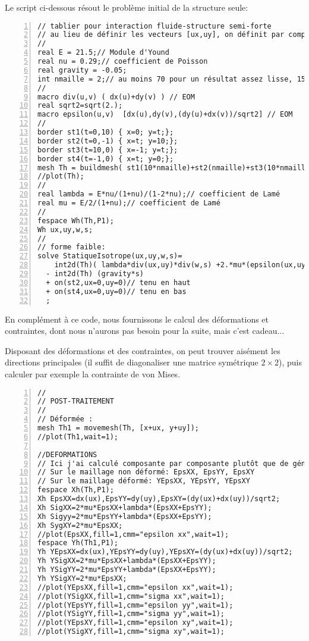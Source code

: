 Le script \freefem ci-dessous résout le problème initial de la structure seule:
\scriptsize
\begin{Verbatim}[numbers=left,numbersep=3pt]
// tablier pour interaction fluide-structure semi-forte
// au lieu de définir les vecteurs [ux,uy], on définit par composantes
//
real E = 21.5;// Module d'Yound
real nu = 0.29;// coefficient de Poisson
real gravity = -0.05;
int nmaille = 2;// au moins 70 pour un résultat assez lisse, 150 c'est mieux mais long
//
macro div(u,v) ( dx(u)+dy(v) ) // EOM
real sqrt2=sqrt(2.);
macro epsilon(u,v)  [dx(u),dy(v),(dy(u)+dx(v))/sqrt2] // EOM
//
border st1(t=0,10) { x=0; y=t;};
border st2(t=0,-1) { x=t; y=10;};
border st3(t=10,0) { x=-1; y=t;};
border st4(t=-1,0) { x=t; y=0;};
mesh Th = buildmesh( st1(10*nmaille)+st2(nmaille)+st3(10*nmaille)+st4(nmaille));
//plot(Th);
//
real lambda = E*nu/(1+nu)/(1-2*nu);// coefficient de Lamé
real mu = E/2/(1+nu);// coefficient de Lamé
//
fespace Wh(Th,P1);
Wh ux,uy,w,s;
//
// forme faible:
solve StatiqueIsotrope(ux,uy,w,s)=
	int2d(Th)( lambda*div(ux,uy)*div(w,s) +2.*mu*(epsilon(ux,uy)'*epsilon(w,s)) )
  - int2d(Th) (gravity*s)
  + on(st2,ux=0,uy=0)// tenu en haut
  + on(st4,ux=0,uy=0)// tenu en bas
  ;
\end{Verbatim}
\normalsize

\begin{remarque}
En complément à ce code, nous fournissons le calcul des déformations et contraintes, dont nous n'aurons pas besoin pour la suite, mais c'est cadeau...

Disposant des déformations et des contraintes, on peut trouver aisément les directions principales (il suffit de diagonaliser une matrice symétrique $2\times2$), puis calculer par exemple la contrainte de von Mises.
\scriptsize
\begin{Verbatim}[numbers=left,numbersep=3pt,firstnumber=last]
//
// POST-TRAITEMENT
//
// Déformée :
mesh Th1 = movemesh(Th, [x+ux, y+uy]);
//plot(Th1,wait=1);

//DEFORMATIONS
// Ici j'ai calculé composante par composante plutôt que de générer un vecteur
// Sur le maillage non déformé: EpsXX, EpsYY, EpsXY
// Sur le maillage déformé: YEpsXX, YEpsYY, YEpsXY
fespace Xh(Th,P1);
Xh EpsXX=dx(ux),EpsYY=dy(uy),EpsXY=(dy(ux)+dx(uy))/sqrt2;
Xh SigXX=2*mu*EpsXX+lambda*(EpsXX+EpsYY);
Xh Sigyy=2*mu*EpsYY+lambda*(EpsXX+EpsYY);
Xh SygXY=2*mu*EpsXX;
//plot(EpsXX,fill=1,cmm="epsilon xx",wait=1);
fespace Yh(Th1,P1);
Yh YEpsXX=dx(ux),YEpsYY=dy(uy),YEpsXY=(dy(ux)+dx(uy))/sqrt2;
Yh YSigXX=2*mu*EpsXX+lambda*(EpsXX+EpsYY);
Yh YSigYY=2*mu*EpsYY+lambda*(EpsXX+EpsYY);
Yh YSigXY=2*mu*EpsXX;
//plot(YEpsXX,fill=1,cmm="epsilon xx",wait=1);
//plot(YSigXX,fill=1,cmm="sigma xx",wait=1);
//plot(YEpsYY,fill=1,cmm="epsilon yy",wait=1);
//plot(YSigYY,fill=1,cmm="sigma yy",wait=1);
//plot(YEpsXY,fill=1,cmm="epsilon xy",wait=1);
//plot(YSigXY,fill=1,cmm="sigma xy",wait=1);
\end{Verbatim}
\normalsize
\end{remarque}

